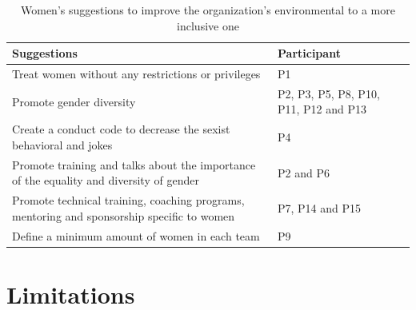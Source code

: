 \documentclass{IEEEcsmag}
\begin{document}

\begin{table}[htbp]
    \centering
    \caption{Women's suggestions to improve the organization's environmental to a more inclusive one}
    \label{tab:inclusive}
    \begin{tabular}{p{4.5cm}p{2cm}} 
    \toprule
    \textbf{Suggestions}  & \textbf{Participant}\\ \midrule
    Treat women without any restrictions or privileges & P1 \\
    Promote gender diversity  & P2, P3, P5, P8, P10, P11, P12 and P13   \\ 
    Create a conduct code to decrease the sexist behavioral and jokes & P4 \\
    Promote training and talks about the importance of the equality and diversity of gender & P2 and P6 \\
    Promote technical training, coaching programs, mentoring and sponsorship specific to women & P7, P14 and P15  \\ 
    Define a minimum amount of women in each team  & P9 \\ \bottomrule
    \end{tabular}
\end{table}



\section{Limitations}
\label{limitations}

\end{document}
